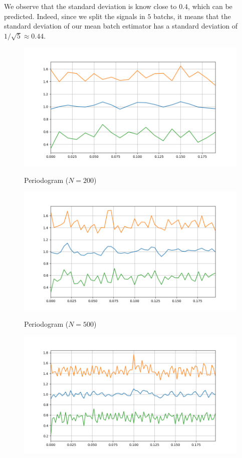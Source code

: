 \documentclass[11pt]{article}
\begin{document}
\begin{solution}
    We observe that the standard deviation is know close to $0.4$, which can be predicted.
    Indeed, since we split the signals in $5$ batchs, it means that the standard deviation of our mean batch estimator has a standard deviation of $1/\sqrt{5}\approx 0.44$.
\begin{figure}
    \centering
    \begin{minipage}[t]{0.3\textwidth}
    \centerline{\includegraphics[width=\textwidth]{Assignment 1 - ML for TS (MVA 2023-2024)/bartlett_periodogram_N=200.png}}
    \centerline{Periodogram ($N=200$)}
    \end{minipage}
    \begin{minipage}[t]{0.3\textwidth}
    \centerline{\includegraphics[width=\textwidth]{Assignment 1 - ML for TS (MVA 2023-2024)/bartlett_periodogram_N=500.png}}
    \centerline{Periodogram ($N=500$)}
    \end{minipage}
    \begin{minipage}[t]{0.3\textwidth}
    \centerline{\includegraphics[width=\textwidth]{Assignment 1 - ML for TS (MVA 2023-2024)/bartlett_periodogram_N=1000.png}}

\end{minipage}
\end{figure}
\end{solution}
\end{document}
